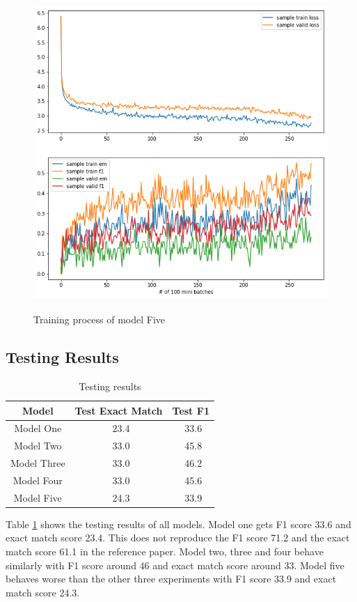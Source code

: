 \documentclass[modernstyle,12pt]{sjsuthesis}
\theoremstyle{definition}
\begin{document}
\begin{figure}[htbp]\centering
  \includegraphics[width=12cm, height=12cm]{figures/match_change3.png}
  \caption{Training process of model Five}
  \label{f:baseline_change3}
\end{figure}

\subsection{Testing Results}

\begin{table}[htbp]\centering
  \caption{Testing results}
  \label{tab:test_results}
  \begin{tabular}{|c|c|c|}
    \hline
    Model& Test Exact Match & Test F1 \\
    \hline\hline
    Model One & \ 23.4 &\ 33.6 \\
    Model Two & \ 33.0 &\ 45.8 \\
    Model Three & \ 33.0 &\ 46.2 \\
    Model Four & \ 33.0 &\ 45.6 \\
    Model Five & \ 24.3 &\ 33.9 \\
    \hline
  \end{tabular}
\end{table}

Table \ref{tab:test_results} shows the testing results of all models. Model one gets F1 score 33.6 and exact match score 23.4. This does not reproduce the F1 score 71.2 and the exact match score 61.1 in the reference paper\cite{wang2016machine}. Model two, three and four behave similarly with F1 score around 46 and exact match score around 33. Model five behaves worse than the other three experiments with F1 score 33.9 and exact match score 24.3.
\end{document}
